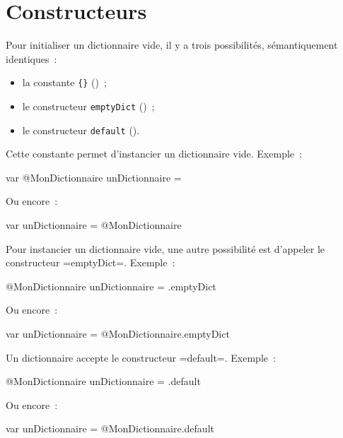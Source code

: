 \section{Constructeurs}

Pour initialiser un dictionnaire vide, il y a trois possibilités, sémantiquement identiques~:
\begin{itemize}
  \item la constante \texttt{\{\}} ()~; 
  \item le constructeur \texttt{emptyDict} ()~; 
  \item le constructeur \texttt{default} (). 
\end{itemize}



Cette constante permet d'instancier un dictionnaire vide. Exemple~:
\begin{galgas}
var @MonDictionnaire unDictionnaire = {}
\end{galgas}

Ou encore~:

\begin{galgas}
var unDictionnaire = @MonDictionnaire {}
\end{galgas}


Pour instancier un dictionnaire vide, une autre possibilité est d'appeler le constructeur \ggs=emptyDict=. Exemple~:
\begin{galgas}
@MonDictionnaire unDictionnaire = .emptyDict
\end{galgas}

Ou encore~:

\begin{galgas}
var unDictionnaire = @MonDictionnaire.emptyDict
\end{galgas}

 



Un dictionnaire accepte le constructeur \ggs=default=. Exemple~:
\begin{galgas}
@MonDictionnaire unDictionnaire = .default
\end{galgas}

Ou encore~:

\begin{galgas}
var unDictionnaire = @MonDictionnaire.default
\end{galgas}


